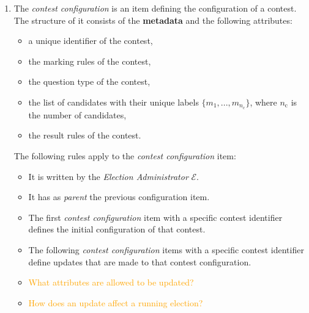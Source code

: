 \begin{enumerate}
    \item 
        The \textit{contest configuration} is an item defining the configuration of a contest. The structure of it consists of the \textbf{metadata} and the following attributes:
        \begin{itemize}
            \item a unique identifier of the contest,
            \item the marking rules of the contest,
            \item the question type of the contest,
            \item the list of candidates with their unique labels $\{m_1, ..., m_{n_\mathrm{c}}\}$, where $n_\mathrm{c}$ is the number of candidates,
            \item the result rules of the contest.
        \end{itemize}
        The following rules apply to the \textit{contest configuration} item:
        \begin{itemize}
            \item It is written by the \textit{Election Administrator} $\mathcal{E}$.
            \item It has as \textit{parent} the previous configuration item.
            \item The first \textit{contest configuration} item with a specific contest identifier defines the initial configuration of that contest.
            \item The following \textit{contest configuration} items with a specific contest identifier define updates that are made to that contest configuration.
            \item \textcolor{orange}{What attributes are allowed to be updated?}
            \item \textcolor{orange}{How does an update affect a running election?}
        \end{itemize}
        

\end{enumerate}
